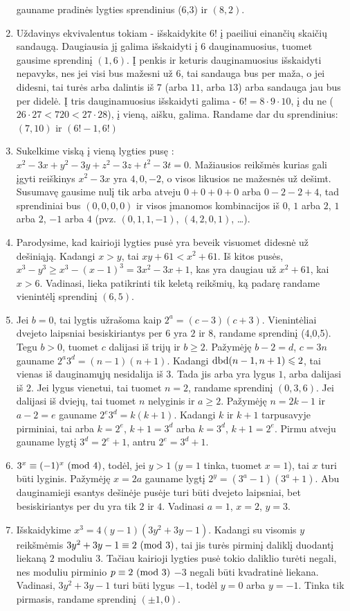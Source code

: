 \begin{enumerate}
    gauname pradinės lygties sprendinius (6,3) ir $(8,2)$.
\item
    Uždavinys ekvivalentus tokiam - išskaidykite $6!$ į paeiliui einančių
    skaičių sandaugą. Daugiausia jį galima išskaidyti į $6$
    dauginamuosius, tuomet gausime sprendinį $(1,6)$. Į penkis ir keturis
    dauginamuosius išskaidyti nepavyks, nes jei visi bus mažesni už
    $6$, tai sandauga bus per maža, o jei didesni, tai turės arba dalintis
    iš $7$ (arba $11$, arba $13$) arba sandauga jau bus per didelė. Į tris
    dauginamuosius išskaidyti galima - $6! = 8\cdot 9 \cdot 10$, į du ne
    ($26\cdot27 < 720 < 27\cdot 28$), į vieną, aišku, galima. Randame dar
    du sprendinius: $(7,10)$ ir $(6!-1, 6!)$
\item
    Sukelkime viską į vieną lygties pusę : $x^2 - 3x + y^2 - 3y + z^2 - 3z
    + t^2 - 3t = 0$. Mažiausios reikšmės kurias gali įgyti reiškinys
    $x^2 - 3x$ yra $4, 0, -2$, o visos likusios ne mažesnės už dešimt.
    Susumavę gausime nulį tik arba atveju $0+0+0+0$ arba $0-2-2+4$, tad
    sprendiniai bus $(0,0,0,0)$ ir visos įmanomos kombinacijos iš $0$, $1$
    arba $2$, $1$ arba $2$, $-1$ arba $4$ (pvz. $(0,1,1,-1)$, $(4,2,0,1)$,
    \ldots).
\item
    Parodysime, kad kairioji lygties pusė yra beveik visuomet didesnė už
    dešiniąją. Kadangi $x>y$, tai $xy+61<x^2+61$. Iš kitos pusės,
    $x^3-y^3 \geq x^3 - (x-1)^3 = 3x^2 - 3x + 1$, kas yra daugiau už
    $x^2 + 61$, kai $x>6$. Vadinasi, lieka patikrinti tik keletą reikšmių,
    ką padarę randame vienintėlį sprendinį $(6,5)$.
\item
    Jei $b=0$, tai lygtis užrašoma kaip $2^a = (c-3)(c+3)$. Vienintėliai
    dvejeto laipsniai besiskiriantys per $6$ yra $2$ ir $8$, randame
    sprendinį (4,0,5). Tegu $b>0$, tuomet $c$ dalijasi iš trijų ir
    $b\geq 2$. Pažymėję $b-2 = d$, $c = 3n$ gauname $2^a3^d =
    (n-1)(n+1)$. Kadangi $\operatorname{dbd}(n-1, n+1) \leqslant 2$, tai vienas iš dauginamųjų
    nesidalija iš $3$. Tada jis arba yra lygus $1$, arba dalijasi iš
    $2$. Jei lygus vienetui, tai tuomet $n=2$, randame sprendinį $(0,3,6)$.
    Jei dalijasi iš dviejų, tai tuomet $n$ nelyginis ir $a\geq 2$. Pažymėję
    $n=2k-1$ ir $a-2 = e$ gauname $2^e3^d = k(k+1)$. Kadangi $k$ ir
    $k+1$ tarpusavyje pirminiai, tai arba $k=2^e$, $k+1=3^d$ arba $k=3^d$,
    $k+1 = 2^e$. Pirmu atveju gauname lygtį $3^d = 2^e+1$, antru $2^e = 3^d
    + 1$.  
\item
    $3^x \equiv (-1)^x \ (\text{mod } 4)$, todėl, jei $y>1$ ($y=1$ tinka, tuomet
    $x=1$), tai $x$ turi būti lyginis. Pažymėję $x=2a$ gauname lygtį
    $2^y = (3^a-1)(3^a+1)$. Abu dauginamieji esantys dešinėje pusėje turi
    būti dvejeto laipsniai, bet besiskiriantys per du yra tik $2$ ir
    $4$. Vadinasi $a=1$, $x=2$, $y=3$.
\item
    Išskaidykime $x^3 = 4(y-1)(3y^2 + 3y -1)$. Kadangi su visomis $y$
    reikšmėmis $3y^2 + 3y - 1 \equiv 2 \ (\text{mod } 3)$, tai jis turės pirminį
    daliklį duodantį liekaną $2$ moduliu $3$. Tačiau kairioji lygties pusė
    tokio daliklio turėti negali, nes moduliu pirminio $p \equiv 2
    \ (\text{mod } 3)$ $-3$ negali būti kvadratinė liekana.  Vadinasi, $3y^2 + 3y - 1$
    turi būti lygus $-1$, todėl $y=0$ arba $y=-1$. Tinka tik pirmasis,
    randame sprendinį $(\pm 1,0)$. 
\end{enumerate} 
